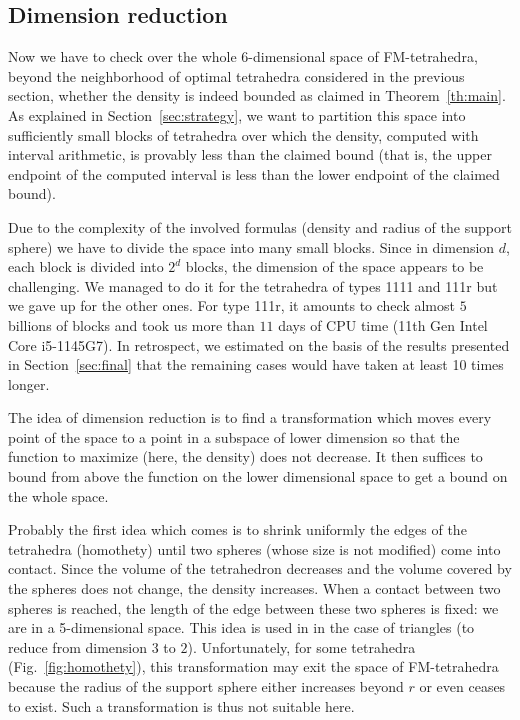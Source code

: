 \documentclass[11pt]{article}
\begin{document}
\subsection{Dimension reduction}

Now we have to check over the whole 6-dimensional space of FM-tetrahedra, beyond the neighborhood of optimal tetrahedra considered in the previous section, whether the density is indeed bounded as claimed in Theorem~\ref{th:main}.
As explained in Section~\ref{sec:strategy}, we want to partition this space into sufficiently small blocks of tetrahedra over which the density, computed with interval arithmetic, is provably less than the claimed bound (that is, the upper endpoint of the computed interval is less than the lower endpoint of the claimed bound).

Due to the complexity of the involved formulas (density and radius of the support sphere) we have to divide the space into many small blocks.
Since in dimension $d$, each block is divided into $2^d$ blocks, the dimension of the space appears to be challenging.
We managed to do it for the tetrahedra of types 1111 and 111r but we gave up for the other ones.
For type 111r, it amounts to check almost $5$ billions of blocks and took us more than $11$ days of CPU time (11th Gen Intel Core i5-1145G7).
In retrospect, we estimated on the basis of the results presented in Section~\ref{sec:final} that the remaining cases would have taken at least 10 times longer.

The idea of dimension reduction is to find a transformation which moves every point of the space to a point in a subspace of lower dimension so that the function to maximize (here, the density) does not decrease.
It then suffices to bound from above the function on the lower dimensional space to get a bound on the whole space.

Probably the first idea which comes is to shrink uniformly the edges of the tetrahedra (homothety) until two spheres (whose size is not modified) come into contact.
Since the volume of the tetrahedron decreases and the volume covered by the spheres does not change, the density increases.
When a contact between two spheres is reached, the length of the edge between these two spheres is fixed: we are in a 5-dimensional space.
This idea is used in \cite{FM58} in the case of triangles (to reduce from dimension $3$ to $2$).
Unfortunately, for some tetrahedra (Fig.~\ref{fig:homothety}), this transformation may exit the space of FM-tetrahedra because the radius of the support sphere either increases beyond $r$ or even ceases to exist.
Such a transformation is thus not suitable here.
\end{document}
